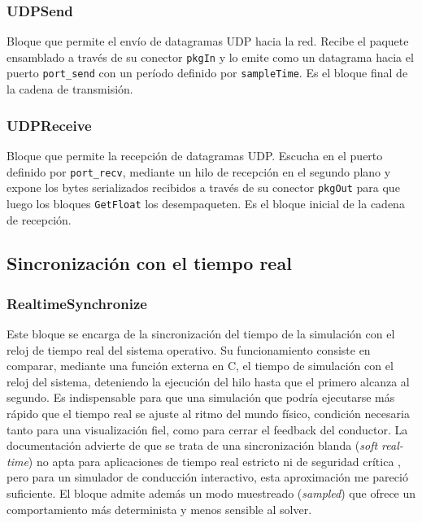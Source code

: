 \subsubsection{UDPSend}
Bloque que permite el envío de datagramas UDP hacia la red. Recibe el paquete ensamblado a través de su conector \verb|pkgIn| y lo emite como un datagrama hacia el puerto \verb|port_send| con un período definido por \verb|sampleTime|. Es el bloque final de la cadena de transmisión.



\subsubsection{UDPReceive}
Bloque que permite la recepción de datagramas UDP. Escucha en el puerto definido por \verb|port_recv|, mediante un hilo de recepción en el segundo plano y expone los bytes serializados recibidos a través de su conector \verb|pkgOut| para que luego los bloques \verb|GetFloat| los desempaqueten. Es el bloque inicial de la cadena de recepción.

\subsection*{Sincronización con el tiempo real}



\subsubsection{RealtimeSynchronize}
Este bloque se encarga de la sincronización del tiempo de la simulación con el reloj de tiempo real del sistema operativo. Su funcionamiento consiste en comparar, mediante una función externa en C, el tiempo de simulación con el reloj del sistema, deteniendo la ejecución del hilo hasta que el primero alcanza al segundo. Es indispensable para que una simulación que podría ejecutarse más rápido que el tiempo real se ajuste al ritmo del mundo físico, condición necesaria tanto para una visualización fiel, como para cerrar el feedback del conductor. La documentación advierte de que se trata de una sincronización blanda (\textit{soft real-time}) no apta para aplicaciones de tiempo real estricto ni de seguridad crítica \cite{mdd}, pero para un simulador de conducción interactivo, esta aproximación me pareció suficiente. El bloque admite además un modo muestreado (\textit{sampled}) que ofrece un comportamiento más determinista y menos sensible al solver.

